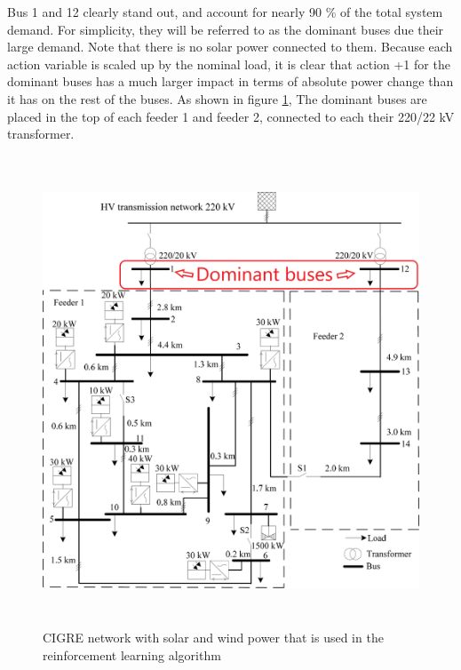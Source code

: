 \documentclass[class=book, crop=false]{standalone}
\begin{document}
Bus 1 and 12 clearly stand out, and account for nearly 90 \% of the total system demand. For simplicity, they will be referred to as the dominant buses due their large demand. Note that there is no solar power connected to them. Because each action variable is scaled up by the nominal load, it is clear that action +1 for the dominant buses has a much larger impact in terms of absolute power change than it has on the rest of the buses. As shown in figure \ref{fig:discussion:cigre_network_dominant}, The dominant buses are placed in the top of each feeder 1 and feeder 2, connected to each their 220/22 kV transformer. 

\begin{figure}[ht]
    \center
    \includegraphics[height=14cm, width=13.5cm]{figures/cigre_network_dominant.png}
    \caption[size = 9]{CIGRE network with solar and wind power that is used in the reinforcement learning algorithm \cite{cigre}}
    \label{fig:discussion:cigre_network_dominant}
\end{figure}
\end{document}

